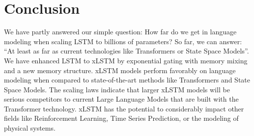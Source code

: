 \section{Conclusion}
We have partly answered our simple question: How far do we get in language modeling when scaling LSTM to billions of parameters? So far, we can answer: ``At least as far as current technologies like Transformers or State Space Models''. We have enhanced LSTM to xLSTM by exponential gating with memory mixing and a new memory structure. xLSTM models perform favorably on language modeling when compared to state-of-the-art methods like Transformers and State Space Models. The scaling laws indicate that larger xLSTM models will be serious competitors to current Large Language Models that are built with the Transformer technology. xLSTM has the potential to considerably impact other fields like Reinforcement Learning, Time Series Prediction, or the modeling of physical systems.


